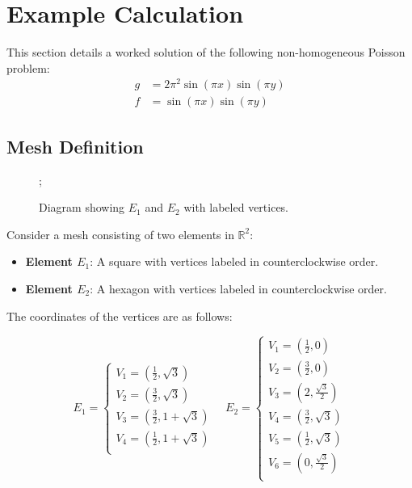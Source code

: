 \documentclass{article}
\begin{document}


\section{Example Calculation}


This section details a worked solution of the following non-homogeneous Poisson problem:
\begin{align}
    g &= 2\pi^2\sin(\pi x)\sin(\pi y)\\
    f &= \sin(\pi x)\sin(\pi y)
\end{align}



\subsection{Mesh Definition}

\begin{figure}[ht!]
    \centering
    ;
    \caption{Diagram showing $E_1$ and $E_2$ with labeled vertices.}
    \label{docs/LaTeX/diagram}
\end{figure}



Consider a mesh consisting of two elements in $\mathbb{R}^2$:

\begin{itemize}
    \item \textbf{Element $E_1$}: A square with vertices labeled in counterclockwise order.
    \item \textbf{Element $E_2$}: A hexagon with vertices labeled in counterclockwise order.
\end{itemize}

The coordinates of the vertices are as follows:

$$E_1 = \begin{cases}
    V_1 = (\frac{1}{2},\sqrt{3}) \\
    V_2 = (\frac{3}{2},\sqrt{3}) \\
    V_3 = (\frac{3}{2},1+\sqrt{3}) \\ 
    V_4 = (\frac{1}{2},1+\sqrt{3}) \\
\end{cases}
\quad
E_2 = \begin{cases}
    V_1 = (\frac{1}{2},0) \\ 
    V_2 = (\frac{3}{2},0) \\ 
    V_3 = (2,\frac{\sqrt{3}}{2}) \\
    V_4 = (\frac{3}{2},\sqrt{3}) \\
    V_5 = (\frac{1}{2}, \sqrt{3}) \\ 
    V_6 = (0, \frac{\sqrt{3}}{2}) \\
\end{cases}$$\\
\end{document}
